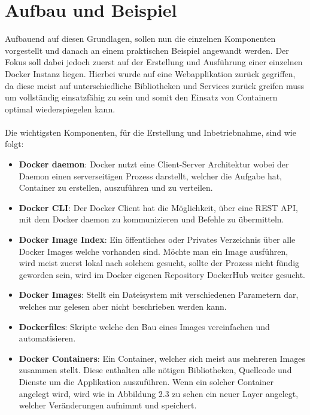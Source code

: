 \documentclass[12pt,toc=bib,toc=listof]{scrreprt}
\begin{document}
\section{Aufbau und Beispiel}

Aufbauend auf diesen Grundlagen, sollen nun die einzelnen Komponenten vorgestellt und danach an einem praktischen Beispiel angewandt werden.
Der Fokus soll dabei jedoch zuerst auf der Erstellung und Ausführung einer einzelnen Docker Instanz liegen.
Hierbei wurde auf eine Webapplikation zurück gegriffen, da diese meist auf unterschiedliche Bibliotheken und Services zurück greifen muss um vollständig einsatzfähig zu sein und somit den Einsatz von Containern optimal wiederspiegelen kann.\\
\\
Die wichtigsten Komponenten, für die Erstellung und Inbetriebnahme, sind wie folgt:
\begin{itemize}
	\item \textbf{Docker daemon}: Docker nutzt eine Client-Server Architektur wobei der Daemon einen serverseitigen Prozess darstellt, welcher die Aufgabe hat, Container zu erstellen, auszuführen und zu verteilen.
	\item \textbf{Docker CLI}: Der Docker Client hat die Möglichkeit, über eine REST API, mit dem Docker daemon zu kommunizieren und Befehle zu übermitteln.
	\item \textbf{Docker Image Index}: Ein öffentliches oder Privates Verzeichnis über alle Docker Images welche vorhanden sind. Möchte man ein Image ausführen, wird meist zuerst lokal nach solchem gesucht, sollte der Prozess nicht fündig geworden sein, wird im Docker eigenen Repository DockerHub weiter gesucht.
	\item \textbf{Docker Images}: Stellt ein Dateisystem mit verschiedenen Parametern dar, welches nur gelesen aber nicht beschrieben werden kann.
	\item \textbf{Dockerfiles}: Skripte welche den Bau eines Images vereinfachen und automatisieren.
	\item \textbf{Docker Containers}: Ein Container, welcher sich meist aus mehreren Images zusammen stellt. Diese enthalten alle nötigen Bibliotheken, Quellcode und Dienste um die Applikation auszuführen. Wenn ein solcher Container angelegt wird, wird wie in Abbildung 2.3 zu sehen ein neuer Layer angelegt, welcher Veränderungen aufnimmt und speichert.
\end{itemize}
\end{document}
